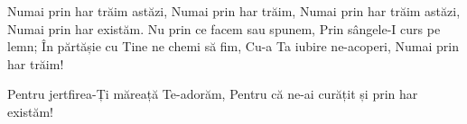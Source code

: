 \beginverse
Numai prin har trăim astăzi,
Numai prin har trăim,
Numai prin har trăim astăzi,
Numai prin har existăm.
Nu prin ce facem sau spunem,
Prin sângele-I curs pe lemn;
În părtășie cu Tine ne chemi să fim,
Cu-a Ta iubire ne-acoperi,
Numai prin har trăim!
\endverse

\beginchorus
Pentru jertfirea-Ți măreață Te-adorăm,
Pentru că ne-ai curățit și prin har existăm!
\endchorus
\endsong